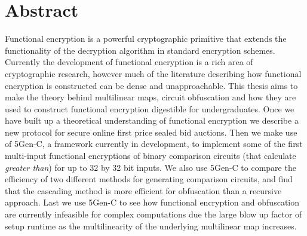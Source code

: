 \documentclass[12pt,twoside]{reedthesis}
\begin{document}
    \chapter*{Abstract}
	Functional encryption is a powerful cryptographic primitive that extends the functionality of the decryption algorithm in standard encryption schemes. Currently the development of functional encryption is a rich area of cryptographic research, however much of the literature describing how functional encryption is constructed can be dense and unapproachable. This thesis aims to make the theory behind multilinear maps, circuit obfuscation and how they are used to construct functional encryption digestible for undergraduates. Once we have built up a theoretical understanding of functional encryption we describe a new protocol for secure online first price sealed bid auctions. Then we make use of 5Gen-C, a framework currently in development, to implement some of the first multi-input functional encryptions of binary comparison circuits (that calculate \textit{greater than}) for up to 32 by 32 bit inputs. We also use 5Gen-C to compare the efficiency of two different methods for generating comparison circuits, and find that the cascading method is more efficient for obfuscation than a recursive approach. Last we use 5Gen-C to see how functional encryption and obfuscation are currently infeasible for complex computations due the large blow up factor of setup runtime as the multilinearity of the underlying multilinear map increases.
	

    \tableofcontents
    
 
  \mainmatter %
  \pagestyle{fancyplain} %
    
\end{document}
